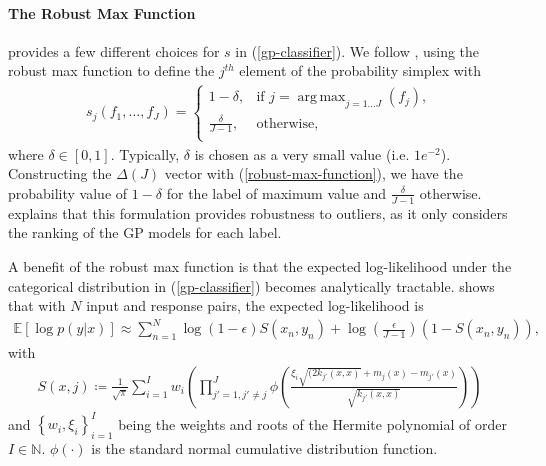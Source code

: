 \documentclass{article}
\DeclareMathOperator*{\argmax}{arg\,max}
\numberwithin{equation}{section}
\begin{document}
\paragraph{The Robust Max Function}\cite{matthews2017scalable} provides a few different choices for $s$ in (\ref{gp-classifier}). We follow \cite{wild2022generalized}, using the robust max function to define the $j^{th}$ element of the probability simplex with
\begin{align}
s_{j}\left(f_1, \dots, f_J\right) = \begin{cases}
      1-\delta, &  \text{if } j = \argmax_{j=1\dots J}\left(f_j\right), \\
      \frac{\delta}{J-1}, & \text{otherwise}, \\
   \end{cases}
   \label{robust-max-function}
\end{align}
where $\delta \in [0, 1]$. 
Typically, $\delta$ is chosen as a very small value (i.e. $1e^{-2}$). 
Constructing the $\Delta(J)$ vector with (\ref{robust-max-function}), we have the probability value of $1-\delta$ for the label of maximum value and $\frac{\delta}{J-1}$ otherwise. 
\cite{wild2022generalized} explains that this formulation provides robustness to outliers, as it only considers the ranking of the GP models for each label.

A benefit of the robust max function is that the expected log-likelihood under the categorical distribution in (\ref{gp-classifier}) becomes analytically tractable. \cite{wild2022generalized} shows that with $N$ input and response pairs, the expected log-likelihood is
\begin{align}
    \mathbb{E} \left[\log p\left(y \vert x\right)\right] \approx \sum_{n=1}^N \log(1-\epsilon) S(x_n, y_n) + \log\left(\frac{\epsilon}{J-1}\right) \left(1-S(x_n, y_n)\right),
    \label{robust-max-function-expected-log-likelihood}
\end{align}
with
\begin{align}
    S(x, j) \coloneqq \frac{1}{\sqrt{\pi}}\sum_{i=1}^{I} w_i \left(\prod_{j'=1, j'\neq j}^J \phi\left(\frac{\xi_i\sqrt{(2 k_{j'}(x, x)}+m_j(x) - m_{j'}(x)}{\sqrt{k_{j'}(x, x)}}\right)\right)
\end{align}
and $\left\{w_i, \xi_i\right\}_{i=1}^I$ being the weights and roots of the Hermite polynomial of order $I \in \mathbb{N}$. $\phi(\cdot)$ is the standard normal cumulative distribution function.

\newpage
\end{document}

